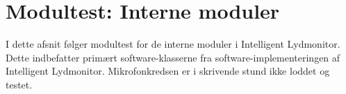 \section{Modultest: Interne moduler}

I dette afsnit følger modultest for de interne moduler i Intelligent Lydmonitor. Dette indbefatter primært software-klasserne fra software-implementeringen af Intelligent Lydmonitor. Mikrofonkredsen er i skrivende stund ikke loddet og testet.








